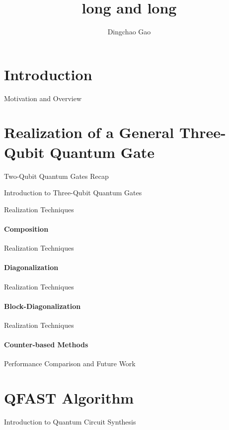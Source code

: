 \documentclass[aspectratio=1610]{beamer}
\title[]{long and long}
\author[Gcc]{Dingchao Gao}
\institute[ISCAS]{Institute of Software Chinese Academy of Sciences}
\begin{document}
\section{Introduction}

\begin{frame}{Motivation and Overview}
\end{frame}

\section{Realization of a General Three-Qubit Quantum Gate}

\begin{frame}{Two-Qubit Quantum Gates Recap}
\end{frame}

\begin{frame}{Introduction to Three-Qubit Quantum Gates}
\end{frame}

\begin{frame}{Realization Techniques}
\framesubtitle{Composition}
\end{frame}

\begin{frame}{Realization Techniques}
\framesubtitle{Diagonalization}
\end{frame}

\begin{frame}{Realization Techniques}
\framesubtitle{Block-Diagonalization}
\end{frame}

\begin{frame}{Realization Techniques}
\framesubtitle{Counter-based Methods}
\end{frame}

\begin{frame}{Performance Comparison and Future Work}
\end{frame}

\section{QFAST Algorithm}

\begin{frame}{Introduction to Quantum Circuit Synthesis}
\end{frame}
\end{document}
